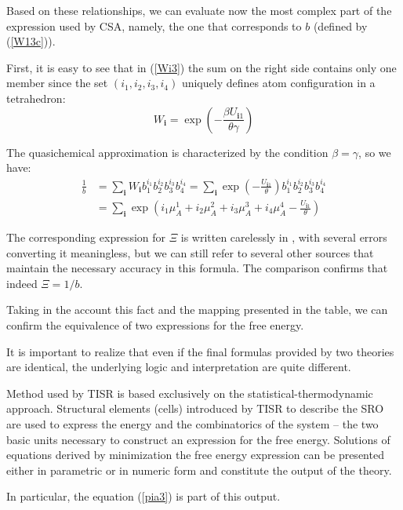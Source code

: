 \documentclass[12pt,abstract]{scrartcl}
\begin{document}
Based on these relationships, we can  evaluate now the most complex  part of the expression used by CSA, namely, the one that corresponds to $b$ (defined by (\ref{W13c})).

First, it is easy to see that in (\ref{Wi3}) the sum on the right side contains only one member since the set $(i_1, i_2, i_3, i_4)$ uniquely defines atom configuration in a tetrahedron:
\[
    W_{\mathbf{i}} =  \exp \left(- \frac{ \beta U_{\mathbf{i}  1} }{\theta\gamma }\right) 
\]

The quasichemical approximation is characterized by the condition $\beta = \gamma$, so we have:
\begin{equation} \label{xi}
\begin{split}
 \frac{1}{b}& =  \sum_{\mathbf{i} } W_{\mathbf{i} }   b_1^{i_1} b_2^{i_2} b_3^{i_3} b_4^{i_4} =
\sum_{\mathbf{i} }  \exp \left(- \frac{  U_{\mathbf{i}  1} }{\theta }\right) b_1^{i_1} b_2^{i_2} b_3^{i_3} b_4^{i_4} \\
&= \sum_{\mathbf{i} }  \exp \left( i_1 \mu_A^1 + i_2 \mu_A^2 +i_3 \mu_A^3 +i_4 \mu_A^4 - \frac{  U_{\mathbf{i}  1} }{\theta }\right) 
\end{split}
\end{equation}

The corresponding expression for $\Xi$ is written carelessly in \cite{Oates1999}, with several errors converting it meaningless, but we can still refer to several other sources \cite{oates1996,  oates2007} that maintain the necessary accuracy in this formula.
The comparison confirms that indeed  $\Xi = 1/b$.

Taking in the account this fact and the mapping presented in the table, we can confirm the equivalence of two expressions for the free energy.

It is important to  realize  that even if the final formulas provided by two theories are identical, the underlying logic and interpretation are quite different.

Method used by TISR is based exclusively on the statistical-thermodynamic approach. 
Structural elements (cells) introduced by TISR to describe the SRO \cite{TISR_p1} are used  to express the  energy and the combinatorics of the system -- the two basic units necessary  to  construct an expression for the free energy. 
Solutions of equations derived by minimization the free energy expression can be presented either  in parametric or in   numeric form and constitute the output of the theory.

In particular, the  equation (\ref{pia3}) is part of this output.
\end{document}
